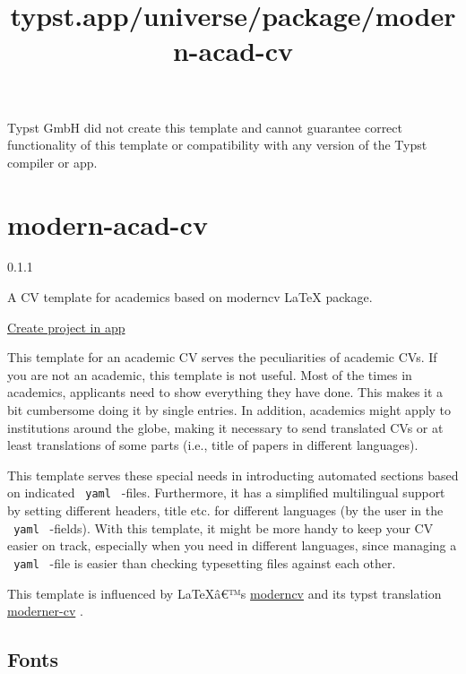 Typst GmbH did not create this template and cannot guarantee correct
functionality of this template or compatibility with any version of the
Typst compiler or app.


\title{typst.app/universe/package/modern-acad-cv}

\label{banner}
\label{template-thumbnail}

\section{modern-acad-cv}\label{modern-acad-cv}

{ 0.1.1 }

A CV template for academics based on moderncv LaTeX package.

\href{/app?template=modern-acad-cv&version=0.1.1}{Create project in app}

\label{readme}
This template for an academic CV serves the peculiarities of academic
CVs. If you are not an academic, this template is not useful. Most of
the times in academics, applicants need to show everything they have
done. This makes it a bit cumbersome doing it by single entries. In
addition, academics might apply to institutions around the globe, making
it necessary to send translated CVs or at least translations of some
parts (i.e., title of papers in different languages).

This template serves these special needs in introducting automated
sections based on indicated \texttt{\ yaml\ } -files. Furthermore, it
has a simplified multilingual support by setting different headers,
title etc. for different languages (by the user in the \texttt{\ yaml\ }
-fields). With this template, it might be more handy to keep your CV
easier on track, especially when you need in different languages, since
managing a \texttt{\ yaml\ } -file is easier than checking typesetting
files against each other.

This template is influenced by LaTeXâ€™s
\href{https://github.com/moderncv/moderncv}{moderncv} and its typst
translation
\href{https://github.com/DeveloperPaul123/modern-cv}{moderner-cv} .

\subsection{Fonts}\label{fonts}

